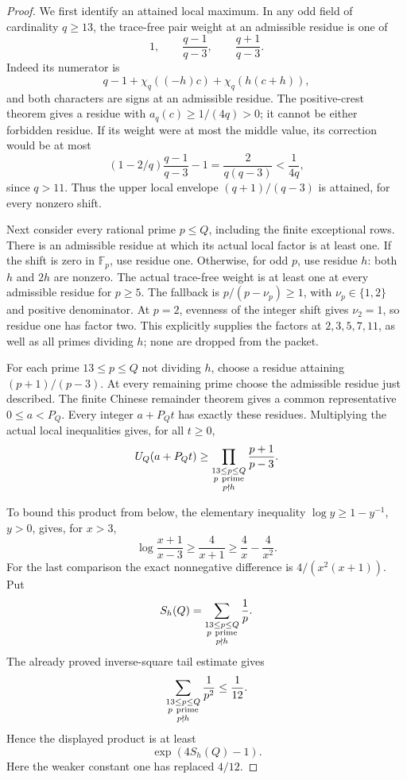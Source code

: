 \documentclass[11pt]{article}
\begin{document}
\begin{proof}
We first identify an attained local maximum. In any odd field of
cardinality \(q\geq13\), the trace-free pair weight at an admissible
residue is one of
\[
                  1,\qquad\frac{q-1}{q-3},\qquad\frac{q+1}{q-3}.
\]
Indeed its numerator is
\[
 q-1+\chi_q((-h)c)+\chi_q(h(c+h)),
\]
and both characters are signs at an admissible residue.
The positive-crest theorem gives a residue with
\(a_q(c)\geq1/(4q)>0\); it cannot be either forbidden residue.
If its weight were at most the middle value, its correction would be
at most
\[
 (1-2/q)\frac{q-1}{q-3}-1
          =\frac{2}{q(q-3)}<\frac1{4q},
\]
since \(q>11\). Thus the upper local envelope
\((q+1)/(q-3)\) is attained, for every nonzero shift.

Next consider every rational prime \(p\leq Q\), including the finite
exceptional rows. There is an admissible residue at which its actual
local factor is at least one. If the shift is zero in \(\mathbb F_p\),
use residue one. Otherwise, for odd \(p\), use residue \(h\):
both \(h\) and \(2h\) are nonzero.
The actual trace-free weight is at least one at every admissible
residue for \(p\geq5\). The fallback is
\(p/(p-\nu_p)\geq1\), with \(\nu_p\in\{1,2\}\) and positive
denominator. At \(p=2\), evenness of the integer shift gives
\(\nu_2=1\), so residue one has factor two.
This explicitly supplies the factors at \(2,3,5,7,11\), as well as
all primes dividing \(h\); none are dropped from the packet.

For each prime \(13\leq p\leq Q\) not dividing \(h\), choose a residue
attaining \((p+1)/(p-3)\). At every remaining prime choose the
admissible residue just described.
The finite Chinese remainder theorem gives a common representative
\(0\leq a<P_Q\). Every integer \(a+P_Qt\) has exactly these residues.
Multiplying the actual local inequalities gives, for all \(t\geq0\),
\[
 U_Q(a+P_Qt)\geq
       \prod_{\substack{13\leq p\leq Q\\p\ {\rm prime}\\p\nmid h}}
                              \frac{p+1}{p-3}.
\]

To bound this product from below, the elementary inequality
\(\log y\geq1-y^{-1}\), \(y>0\), gives, for \(x>3\),
\[
 \log\frac{x+1}{x-3}\geq\frac4{x+1}
                         \geq\frac4x-\frac4{x^2}.
\]
For the last comparison the exact nonnegative difference is
\(4/(x^2(x+1))\).
Put
\[
 S_h(Q)=\sum_{\substack{13\leq p\leq Q\\p\ {\rm prime}\\p\nmid h}}\frac1p.
\]
The already proved inverse-square tail estimate gives
\[
 \sum_{\substack{13\leq p\leq Q\\p\ {\rm prime}\\p\nmid h}}\frac1{p^2}
                                                       \leq\frac1{12}.
\]
Hence the displayed product is at least
\[
                         \exp(4S_h(Q)-1).
\]
Here the weaker constant one has replaced \(4/12\).


\end{proof}
\end{document}
